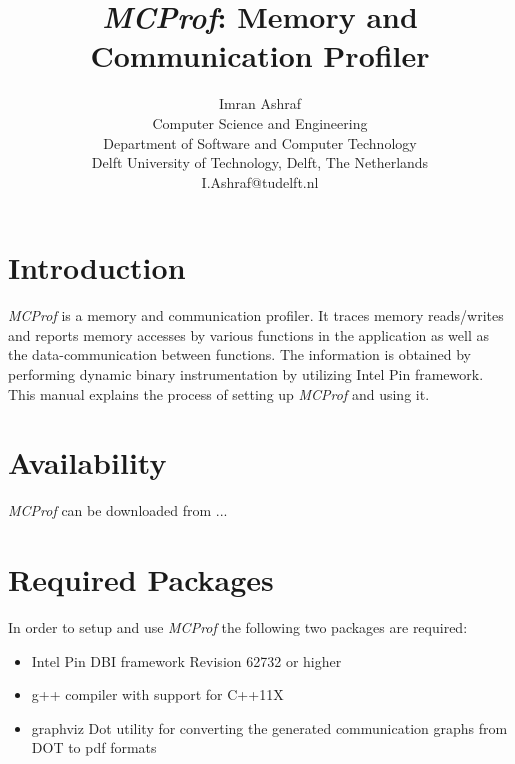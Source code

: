 \documentclass[11pt]{article}
\newcommand{\MCPROF}{\emph{MCProf}}
\begin{document}
\title{\MCPROF{}: Memory and Communication Profiler}
\author{Imran Ashraf \\
    Computer Science and Engineering\\
    Department of Software and Computer Technology\\
    Delft University of Technology, Delft, The Netherlands\\
    I.Ashraf@tudelft.nl
}
\maketitle

\section{Introduction}
\label{sec:introduction}

\MCPROF{} is a memory and communication profiler. It traces memory reads/writes and reports
memory accesses by various functions in the application as well as the
data-communication between functions. The information is obtained by
performing dynamic binary instrumentation by utilizing Intel Pin \cite{Pin} framework.
This manual explains the process of setting up \MCPROF{} and using it.



\section{Availability}
\label{sec:availability}

\MCPROF{} can be downloaded from ...


\section{Required Packages}
\label{sec:reqPackages}

In order to setup and use \MCPROF{} the following two packages are required:

\begin{itemize}
\item Intel Pin DBI framework \cite{Pin} Revision 62732 or higher
\item g++ compiler with support for C++11X
\item  graphviz Dot utility for converting the generated communication graphs from DOT to pdf formats
\end{itemize}
\end{document}
